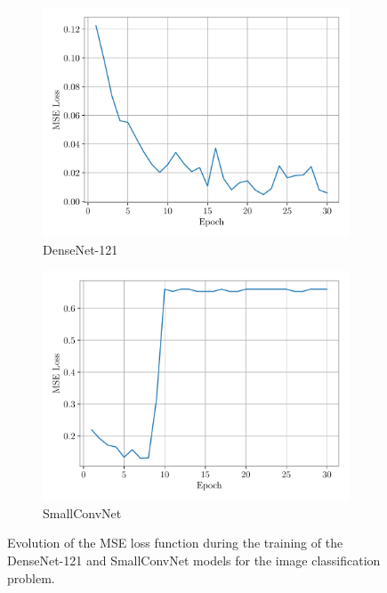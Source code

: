 \begin{figure}[H]
    \centering
    \begin{subfigure}{0.49\textwidth}
        \centering
        \includegraphics[width=\textwidth]{resources/pdf/06/classification/training/densenet121-mse-loss.pdf}
        \caption{DenseNet-121}
    \end{subfigure}
    \hfill
    \begin{subfigure}{0.49\textwidth}
        \centering
        \includegraphics[width=\textwidth]{resources/pdf/06/classification/training/small-mse-loss.pdf}
        \caption{SmallConvNet}
    \end{subfigure}
    \caption{Evolution of the MSE loss function during the training of the DenseNet-121 and SmallConvNet models for the image classification problem.}
    \label{fig:06.classification.others.losses}
\end{figure}

